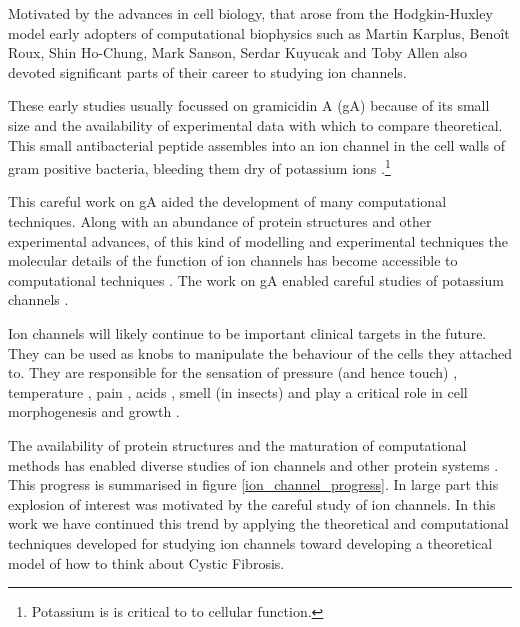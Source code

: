 Motivated by the advances in cell biology, that arose from the Hodgkin-Huxley model early adopters of computational biophysics such as Martin Karplus, Beno\^it Roux, Shin Ho-Chung, Mark Sanson, Serdar Kuyucak and Toby Allen also devoted significant parts of their career to studying ion channels\cite{sansom1991, roux1991, roux1993, sansom1991, allen2003, allen2004, chung2002, tieleman2001}. 

These early studies usually focussed on gramicidin A (gA) because of its small size and the availability of experimental data with which to compare theoretical. This small antibacterial peptide assembles into an ion channel in the cell walls of gram positive bacteria, bleeding them dry of potassium ions \cite{liou2015}.\footnote{Potassium is is critical to to cellular function.}

This careful work on gA aided the development of many computational techniques. Along with an abundance of protein structures and other experimental advances, of this kind of modelling and experimental techniques the molecular details of the function of ion channels has become accessible to computational techniques \cite{flood2019}. The work on gA enabled careful studies of potassium channels \cite{rashid2013, li2021, vandenberg2021}. 

Ion channels will likely continue to be important clinical targets in the future. They can be used as knobs to manipulate the behaviour of the cells they attached to. They are responsible for the sensation of pressure (and hence touch) \cite{chesler2018}, temperature \cite{castillo2018}, pain \cite{kingwell2019}, acids \cite{kweon2013}, smell (in insects) \cite{sato2008} and play a critical role in cell morphogenesis and growth \cite{lang2005, levin2014, levin2014a}.

The availability of protein structures and the maturation of computational methods has enabled diverse studies of ion channels and other protein systems \cite{lev2020, chen2021}. This progress is summarised in figure \ref{ion_channel_progress}. In large part this explosion of interest was motivated by the careful study of ion channels. In this work we have continued this trend by applying the theoretical and computational techniques developed for studying ion channels toward developing a theoretical model of how to think about Cystic Fibrosis. 





